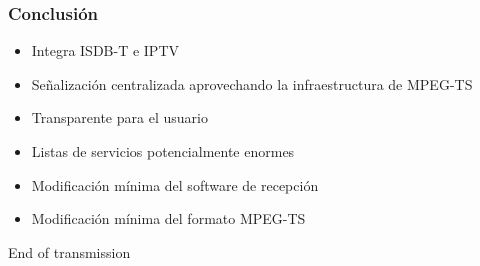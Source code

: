 \documentclass[a4paper,11pt]{beamer}
\begin{document}

\begin{frame}
\frametitle{Conclusión}
\begin{itemize}
\item Integra ISDB-T e IPTV
\item Señalización centralizada aprovechando la infraestructura de MPEG-TS
\item Transparente para el usuario
\item Listas de servicios potencialmente enormes
\item Modificación mínima del software de recepción
\item Modificación mínima del formato MPEG-TS
\end{itemize}
\end{frame}


\begin{frame}
\Huge{\centerline{End of transmission}}
\end{frame}

\end{document}
